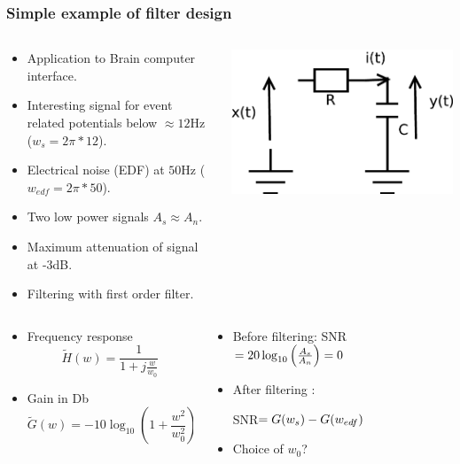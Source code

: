   \frametitle{Simple example  of filter design}
  \begin{columns}
  \begin{column}
 \begin{itemize}
\item Application to Brain computer interface.
\item Interesting signal for event related potentials below $\approx 12$Hz ($w_s=2\pi*12$).
\item Electrical noise (EDF) at $50$Hz ($w_{edf}=2\pi*50$).
\item Two low power signals $A_s\approx A_n$.
\item Maximum attenuation of signal at -3dB.
\item Filtering with first order filter.
\end{itemize}       
  \end{column}
  \begin{column}{5cm}
    \begin{center}
\includegraphics[width=.4\columnwidth]{imgs/fourier/RC2}
\end{center}
  \end{column}
\end{columns}

  \begin{columns}[t]
  \begin{column}
 \begin{itemize}
\item Frequency response
\pause
$$
\tilde H(w)=\frac{1}{1+j\frac{w}{w_0}}
$$
\item Gain in Db
\begin{equation*}
\tilde G(w)={-10\log_{10}\left(1+\frac{w^2}{w_0^2}\right)}
\end{equation*}
 \end{itemize}
  \end{column}
\begin{column}
  \begin{itemize}
  \item Before filtering:
    SNR$=20\log_{10}\left(\frac{A_s}{A_n}\right)=
      {0}$
  \item After filtering : 

SNR$= G(w_s)-G(w_{edf})$

\item Choice of $w_0$?
  \end{itemize}
  \end{column}
\end{columns}


